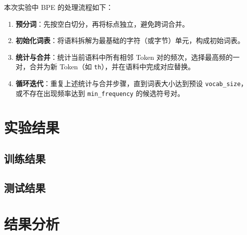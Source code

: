 \documentclass[a4paper,12pt]{ctexart} %
\begin{document}
本次实验中 BPE 的处理流程如下：
\begin{enumerate}
    \item \textbf{预分词}：先按空白切分，再将标点独立，避免跨词合并。
    \item \textbf{初始化词表}：将语料拆解为最基础的字符（或字节）单元，构成初始词表。
    \item \textbf{统计与合并}：统计当前语料中所有相邻 Token 对的频次，选择最高频的一对，合并为新 Token（如 \texttt{th}），并在语料中完成对应替换。
    \item \textbf{循环迭代}：重复上述统计与合并步骤，直到词表大小达到预设 \texttt{vocab\_size}，或不存在出现频率达到 \texttt{min\_frequency} 的候选符号对。
\end{enumerate}

\section{实验结果}


\subsection{训练结果}


\subsection{测试结果}


\section{结果分析}
\end{document}
